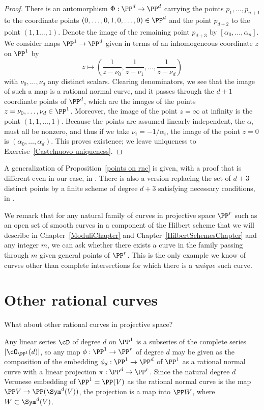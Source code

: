 \begin{proof}
There is an automorphism $\Phi : \PP^d \to \PP^d$ carrying the points $p_1,\dots,p_{n+1}$ to the coordinate points $(0,\dots,0,1,0,\dots,0)\in \PP^d$ and the point $p_{d+2}$ to the point $(1,1\dots,1)$.  Denote the image of the remaining  point $p_{d+3}$  by $[\alpha_0,\dots,\alpha_n]$. We consider maps $\PP^1 \to \PP^d$ given in terms of an inhomogeneous coordinate $z$ on $\PP^1$ by
$$
z \mapsto \left( \frac{1}{z - \nu_0}, \frac{1}{z - \nu_1} , \dots, \frac{1}{z - \nu_d}  \right)
$$
with $\nu_0,\dots,\nu_d$ any distinct scalars. Clearing denominators, we see that the image of such a map is a rational normal curve, and it passes through the $d+1$ coordinate points of $\PP^d$, which are the images of the points $z = \nu_0, \dots, \nu_d \in \PP^1$. Moreover, the image of the point $z = \infty$ at infinity is the point $(1,1, \dots,1)$. Because the points are assumed linearly independent, the $\alpha_i$ must all be nonzero, and thus if we take  $\nu_i = -1/\alpha_i$, the image of the point $z = 0$ is $(\alpha_0,\dots,\alpha_d)$. This proves existence; we leave uniqueness to Exercise~\ref{Castelnuovo uniqueness}. 
\end{proof}

\begin{fact}
A generalization of Proposition~\ref{points on rnc} is given, with a proof that is different
even in our case, in \cite[Proposition 3.19]{Montreal}.  There is also a version replacing the set of $d+3$ distinct points by a  finite
scheme of degree $d+3$ satisfying necessary conditions, in \cite{EHLGP}.
\end{fact}

We remark that for any natural family of curves in projective space $\PP^r$ such as an open set of smooth
curves in a component of the Hilbert scheme that we will describe in Chapter~\ref{ModuliChapter} and Chapter~\ref{HilbertSchemesChapter} and any integer $m$, we can ask whether there exists a curve in the family passing through $m$ given general points of $\PP^r$. This is the only example we know of curves other than complete intersections for which there is a \emph{unique} such curve.


\section{Other rational curves}

What about other rational curves in projective space? 

Any linear series $\cD$ of degree $d$ on $\PP^1$ is a subseries of the complete series $|\cO_{\PP^1}(d)|$, so any map $\phi : \PP^1 \to \PP^r$ of degree $d$ may be given as the
composition of the embedding $\phi_d : \PP^1 \to \PP^d$ of $\PP^1$ as a rational normal curve with a linear projection $\pi : \PP^d \to \PP^r$. Since the natural degree $d$ Veronese embedding of $\PP^1 = \PP(V)$ as the rational normal curve is the map
$\PP V \to \PP(\Sym^d(V))$, the projection is a map into $\PP W$, where $W\subset \Sym^d(V)$. 

